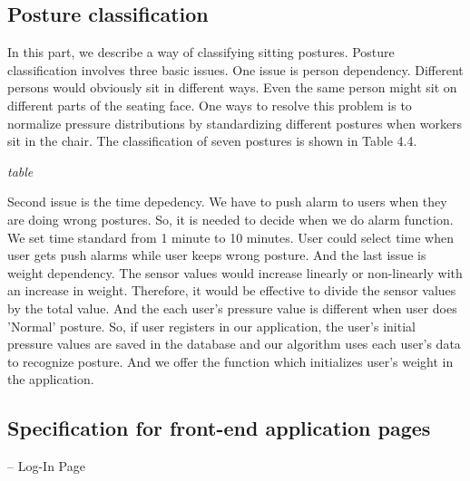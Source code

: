\documentclass[conference]{IEEEtran}
\begin{document}
\subsection{Posture classification\\}

In this part, we describe a way of classifying sitting postures. Posture classification involves three basic issues. One issue is person dependency. Different persons would obviously sit in different ways. Even the same person might sit on different parts of the seating face. One ways to resolve this problem is to normalize pressure distributions by standardizing different postures when workers sit in the chair. The classification of seven postures is shown in Table 4.4.

\emph{table}

Second issue is the time depedency. We have to push alarm to users when they are doing wrong postures. So, it is needed to decide when we do alarm function. We set time standard from 1 minute to 10 minutes. User could select time when user gets push alarms while user keeps wrong posture. 
   And the last issue is weight dependency. The sensor values would increase linearly or non-linearly with an increase in weight. Therefore, it would be effective to divide the sensor values by the total value. And the each user's pressure value is different when user does 'Normal' posture. So, if user registers in our application, the user's initial pressure values are saved in the database and our algorithm uses each user's data to recognize posture. And we offer the function which initializes user's weight in the application. 

\subsection{Specification for front-end application pages\\}



 --	Log-In Page\\
\end{document}
